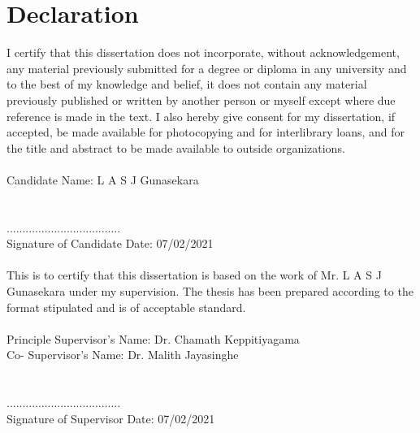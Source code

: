 \chapter*{Declaration}

I certify that this dissertation does not incorporate, without acknowledgement, any material previously submitted for a degree or diploma in any university and to the best of my knowledge and belief, it does not contain any material previously published or written by another person or myself except where due reference is made in the text. I also hereby give consent for my dissertation, if accepted, be made available for photocopying and for interlibrary loans, and for the title and abstract to be made available to outside organizations.
\\\\
Candidate Name: L A S J Gunasekara
\\\\\\
....................................\\
Signature of Candidate
\hspace*{.5\textwidth} Date: 07/02/2021
\\\\
This is to certify that this dissertation is based on the work of 
Mr. L A S J Gunasekara under my supervision. The thesis has been prepared according to the format stipulated and is of acceptable standard.
\\\\
Principle Supervisor’s Name: Dr. Chamath Keppitiyagama \\ 
Co- Supervisor’s Name: \hspace*{.055\textwidth} Dr.  Malith Jayasinghe
\\\\\\
....................................\\
Signature of Supervisor
\hspace*{.5\textwidth} Date: 07/02/2021